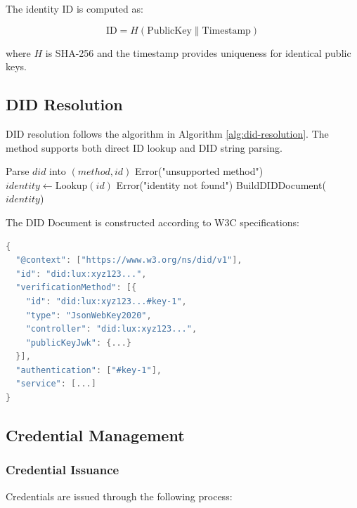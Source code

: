 \documentclass[11pt,twocolumn]{article}
\begin{document}
The identity ID is computed as:

\begin{equation}
\text{ID} = H(\text{PublicKey} \| \text{Timestamp})
\end{equation}

where $H$ is SHA-256 and the timestamp provides uniqueness for identical public keys.

\subsection{DID Resolution}

DID resolution follows the algorithm in Algorithm \ref{alg:did-resolution}. The method supports both direct ID lookup and DID string parsing.

\begin{algorithm}
\caption{DID Resolution}
\label{alg:did-resolution}
\begin{algorithmic}[1]
    \State Parse $did$ into $(method, id)$
        \State \Return Error("unsupported method")
    \EndIf
    \State $identity \gets \text{Lookup}(id)$
        \State \Return Error("identity not found")
    \EndIf
    \State \Return BuildDIDDocument($identity$)
\EndProcedure
\end{algorithmic}
\end{algorithm}

The DID Document is constructed according to W3C specifications:

\begin{lstlisting}[language=Go,basicstyle=\ttfamily\small]
{
  "@context": ["https://www.w3.org/ns/did/v1"],
  "id": "did:lux:xyz123...",
  "verificationMethod": [{
    "id": "did:lux:xyz123...#key-1",
    "type": "JsonWebKey2020",
    "controller": "did:lux:xyz123...",
    "publicKeyJwk": {...}
  }],
  "authentication": ["#key-1"],
  "service": [...]
}
\end{lstlisting}

\subsection{Credential Management}

\subsubsection{Credential Issuance}

Credentials are issued through the following process:
\end{document}
